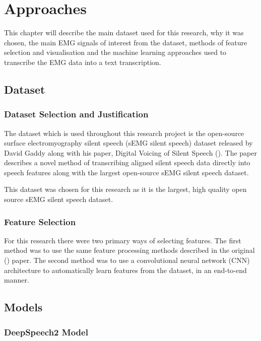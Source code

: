 \chapter{Approaches} \label{chap:approaches}

This chapter will describe the main dataset used for this research, why it was chosen,
the main EMG signals of interest from the dataset, methods of feature selection and
visualisation and the machine learning approaches used to transcribe the EMG data
into a text transcription.

\section{Dataset}

\subsection{Dataset Selection and Justification}

The dataset which is used throughout this research project is the open-source
surface electromyography silent speech (sEMG silent speech) dataset released
by David Gaddy along with his paper, Digital Voicing of Silent Speech
(\cite{gaddy2020digital}).
The paper describes a novel method of transcribing aligned silent speech data
directly into speech features along with the largest open-source sEMG silent
speech dataset.

This dataset was chosen for this research as it is the largest, high quality open
source sEMG silent speech dataset.

\subsection{Feature Selection}

For this research there were two primary ways of selecting features. The first method
was to use the same feature processing methods described in the original
(\cite{gaddy2020digital}) paper. The second method was to use a convolutional
neural network (CNN) architecture to automatically learn features from the
dataset, in an end-to-end manner.

\section{Models}

\subsection{DeepSpeech2 Model}


